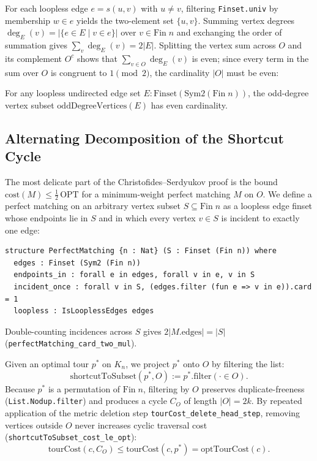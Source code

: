 For each loopless edge $e = s(u,v)$ with $u \ne v$, filtering \texttt{Finset.univ} by membership $w \in e$ yields the two-element set $\{u, v\}$. Summing vertex degrees $\deg_E(v) = |\{e \in E \mid v \in e\}|$ over $v \in \mathrm{Fin}\;n$ and exchanging the order of summation gives $\sum_v \deg_E(v) = 2|E|$. Splitting the vertex sum across $O$ and its complement $O^c$ shows that $\sum_{v \in O} \deg_E(v)$ is even; since every term in the sum over $O$ is congruent to $1 \pmod 2$, the cardinality $|O|$ must be even:
\begin{theorem}
For any loopless undirected edge set $E : \mathrm{Finset}(\mathrm{Sym2}(\mathrm{Fin}\;n))$, the odd-degree vertex subset $\mathrm{oddDegreeVertices}(E)$ has even cardinality.
\end{theorem}

\subsection{Alternating Decomposition of the Shortcut Cycle}

The most delicate part of the Christofides--Serdyukov proof is the bound $\mathrm{cost}(M) \le \frac{1}{2}\,\mathrm{OPT}$ for a minimum-weight perfect matching $M$ on $O$. We define a perfect matching on an arbitrary vertex subset $S \subseteq \mathrm{Fin}\;n$ as a loopless edge finset whose endpoints lie in $S$ and in which every vertex $v \in S$ is incident to exactly one edge:

\noindent\begin{minipage}{\linewidth}
\begin{lstlisting}[language=lean4]
structure PerfectMatching {n : Nat} (S : Finset (Fin n)) where
  edges : Finset (Sym2 (Fin n))
  endpoints_in : forall e in edges, forall v in e, v in S
  incident_once : forall v in S, (edges.filter (fun e => v in e)).card = 1
  loopless : IsLooplessEdges edges
\end{lstlisting}
\end{minipage}
Double-counting incidences across $S$ gives $2|M.\mathrm{edges}| = |S|$ (\texttt{perfectMatching\_card\_two\_mul}).

Given an optimal tour $p^*$ on $K_n$, we project $p^*$ onto $O$ by filtering the list:
\[
  \mathrm{shortcutToSubset}(p^*, O) := p^*.\mathrm{filter}(\cdot \in O).
\]
Because $p^*$ is a permutation of $\mathrm{Fin}\;n$, filtering by $O$ preserves duplicate-freeness (\texttt{List.Nodup.filter}) and produces a cycle $C_O$ of length $|O| = 2k$. By repeated application of the metric deletion step \texttt{tourCost\_delete\_head\_step}, removing vertices outside $O$ never increases cyclic traversal cost (\texttt{shortcutToSubset\_cost\_le\_opt}):
\begin{equation}
  \mathrm{tourCost}(c, C_O) \le \mathrm{tourCost}(c, p^*) = \mathrm{optTourCost}(c).
\end{equation}


